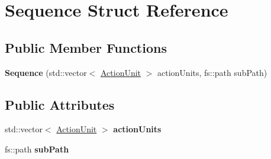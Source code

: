 \hypertarget{structSequence}{}\section{Sequence Struct Reference}
\label{structSequence}
\subsection*{Public Member Functions}
\begin{DoxyCompactItemize}
\item 
\hypertarget{structSequence_a201c7a4cee0a9dc4462527a3caeb5aa7}{}{\bfseries Sequence} (std\+::vector$<$ \hyperlink{classinsight_1_1ActionUnit}{Action\+Unit} $>$ action\+Units, fs\+::path sub\+Path)\label{structSequence_a201c7a4cee0a9dc4462527a3caeb5aa7}

\end{DoxyCompactItemize}
\subsection*{Public Attributes}
\begin{DoxyCompactItemize}
\item 
\hypertarget{structSequence_a6959e174624666d3343745e3c4c41894}{}std\+::vector$<$ \hyperlink{classinsight_1_1ActionUnit}{Action\+Unit} $>$ {\bfseries action\+Units}\label{structSequence_a6959e174624666d3343745e3c4c41894}

\item 
\hypertarget{structSequence_aade2efc066356f2d3b2daba582ae26d0}{}fs\+::path {\bfseries sub\+Path}\label{structSequence_aade2efc066356f2d3b2daba582ae26d0}

\end{DoxyCompactItemize}
